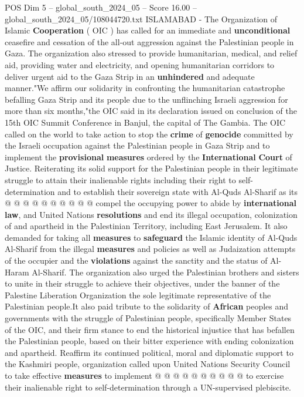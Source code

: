 \begin{textsample}{POS Dim 5 – global\_south\_2024\_05 – Score 16.00 – global\_south\_2024\_05/108044720.txt}  \label{ex:f5_pos_074}
ISLAMABAD - The Organization of Islamic \textbf{Cooperation} ( OIC ) has called for an immediate and \textbf{unconditional} ceasefire and cessation of the all-out aggression against the Palestinian people in Gaza.
The organization also stressed to provide humanitarian, medical, and relief aid, providing water and electricity, and opening humanitarian corridors to deliver urgent aid to the Gaza Strip in an \textbf{unhindered} and adequate manner."We affirm our solidarity in confronting the humanitarian catastrophe befalling Gaza Strip and its people due to the unflinching Israeli aggression for more than six months,"the OIC said in its declaration issued on conclusion of the 15th OIC Summit Conference in Banjul, the capital of The Gambia.
The OIC called on the world to take action to stop the \textbf{crime} of \textbf{genocide} committed by the Israeli occupation against the Palestinian people in Gaza Strip and to implement the \textbf{provisional} \textbf{measures} ordered by the \textbf{International} \textbf{Court} of Justice.
Reiterating its solid support for the Palestinian people in their legitimate struggle to attain their inalienable rights including their right to self-determination and to establish their sovereign state with Al-Quds Al-Sharif as its @ @ @ @ @ @ @ @ @ @ compel the occupying power to abide by \textbf{international} \textbf{law}, and United Nations \textbf{resolutions} and end its illegal occupation, colonization of and apartheid in the Palestinian Territory, including East Jerusalem.
It also demanded for taking all \textbf{measures} to \textbf{safeguard} the Islamic identity of Al-Quds Al-Sharif from the illegal \textbf{measures} and policies as well as Judaization attempts of the occupier and the \textbf{violations} against the sanctity and the status of Al-Haram Al-Sharif.
The organization also urged the Palestinian brothers and sisters to unite in their struggle to achieve their objectives, under the banner of the Palestine Liberation Organization the sole legitimate representative of the Palestinian people.It also paid tribute to the solidarity of \textbf{African} peoples and governments with the struggle of Palestinian people, specifically Member States of the OIC, and their firm stance to end the historical injustice that has befallen the Palestinian people, based on their bitter experience with ending colonization and apartheid.
Reaffirm its continued political, moral and diplomatic support to the Kashmiri people, organization called upon United Nations Security Council to take effective \textbf{measures} to implement @ @ @ @ @ @ @ @ @ @ to exercise their inalienable right to self-determination through a UN-supervised plebiscite.

\end{textsample}
